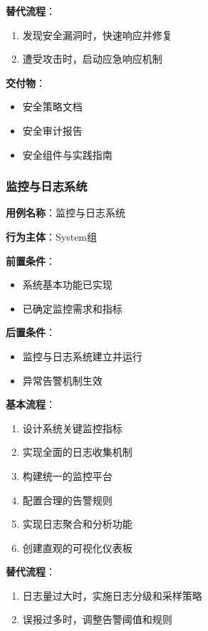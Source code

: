 \documentclass[a4paper,12pt]{article}
\begin{document}
\textbf{替代流程}：
\begin{enumerate}
  \item 发现安全漏洞时，快速响应并修复
  \item 遭受攻击时，启动应急响应机制
\end{enumerate}

\textbf{交付物}：
\begin{itemize}
  \item 安全策略文档
  \item 安全审计报告
  \item 安全组件与实践指南
\end{itemize}

\subsubsection{监控与日志系统}

\textbf{用例名称}：监控与日志系统

\textbf{行为主体}：System组

\textbf{前置条件}：
\begin{itemize}
  \item 系统基本功能已实现
  \item 已确定监控需求和指标
\end{itemize}

\textbf{后置条件}：
\begin{itemize}
  \item 监控与日志系统建立并运行
  \item 异常告警机制生效
\end{itemize}

\textbf{基本流程}：
\begin{enumerate}
  \item 设计系统关键监控指标
  \item 实现全面的日志收集机制
  \item 构建统一的监控平台
  \item 配置合理的告警规则
  \item 实现日志聚合和分析功能
  \item 创建直观的可视化仪表板
\end{enumerate}

\textbf{替代流程}：
\begin{enumerate}
  \item 日志量过大时，实施日志分级和采样策略
  \item 误报过多时，调整告警阈值和规则
\end{enumerate}
\end{document}
